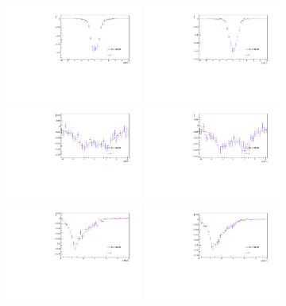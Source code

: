 \begin{figure} \centering
  \includegraphics[width=0.4\textwidth]{fig/chapt4/gen_plots/blp_deltaEta_compare.pdf}
  \includegraphics[width=0.4\textwidth]{fig/chapt4/gen_plots/bbarlm_deltaEta_compare.pdf}\\
  \includegraphics[width=0.4\textwidth]{fig/chapt4/gen_plots/blp_deltaphi_compare.pdf}
  \includegraphics[width=0.4\textwidth]{fig/chapt4/gen_plots/bbarlm_deltaphi_compare.pdf}\\
  \includegraphics[width=0.4\textwidth]{fig/chapt4/gen_plots/blp_deltaR_compare.pdf}
  \includegraphics[width=0.4\textwidth]{fig/chapt4/gen_plots/bbarlm_deltaR_compare.pdf}

\end{figure}
